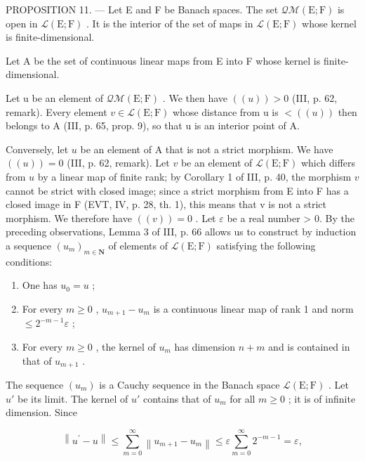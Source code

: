 PROPOSITION 11. --- Let E and F be Banach spaces. The set \(\mathcal{Q}\mathcal{M}(\mathrm{E};\mathrm{F})\) is open in \(\mathcal{L}(\mathrm{E};\mathrm{F})\) . It is the interior of the set of maps in \(\mathcal{L}(\mathrm{E};\mathrm{F})\) whose kernel is finite-dimensional.

Let A be the set of continuous linear maps from E into F whose kernel is finite-dimensional.

Let u be an element of \(\mathcal{Q}\mathcal{M}(\mathrm{E};\mathrm{F})\) . We then have \(((u)) > 0\) (III, p. 62, remark). Every element \(v \in \mathcal{L}(\mathrm{E};\mathrm{F})\) whose distance from u is \(<((u))\) then belongs to A (III, p. 65, prop. 9), so that u is an interior point of A.

Conversely, let \(u\) be an element of A that is not a strict morphism. We have \(((u)) = 0\) (III, p. 62, remark). Let \(v\) be an element of \(\mathcal{L}(\mathrm{E};\mathrm{F})\) which differs from \(u\) by a linear map of finite rank; by Corollary 1 of III, p. 40, the morphism \(v\) cannot be strict with closed image; since a strict morphism from E into F has a closed image in F (EVT, IV, p. 28, th. 1), this means that v is not a strict morphism. We therefore have \(((v)) = 0\) . Let \(\varepsilon\) be a real number \textgreater{} 0. By the preceding observations, Lemma 3 of III, p. 66 allows us to construct by induction a sequence \((u_{m})_{m \in \mathbf{N}}\) of elements of \(\mathcal{L}(\mathrm{E}; \mathrm{F})\) satisfying the following conditions:

\begin{enumerate}
\def\labelenumi{(\roman{enumi})}
\item
  One has \(u_{0}=u\) ;
\item
  For every \(m \geqslant 0\) , \(u_{m+1} - u_m\) is a continuous linear map of rank 1 and norm \(\leqslant 2^{-m-1}\varepsilon\) ;
\item
  For every \(m \geqslant 0\) , the kernel of \(u_m\) has dimension \(n + m\) and is contained in that of \(u_{m+1}\) .
\end{enumerate}

The sequence \((u_{m})\) is a Cauchy sequence in the Banach space \(\mathcal{L}(\mathrm{E};\mathrm{F})\) . Let \(u'\) be its limit. The kernel of \(u'\) contains that of \(u_{m}\) for all \(m \geqslant 0\) ; it is of infinite dimension. Since

\[
\left\| u ^ {\prime} - u \right\| \leqslant \sum_ {m = 0} ^ {\infty} \left\| u _ {m + 1} - u _ {m} \right\| \leqslant \varepsilon \sum_ {m = 0} ^ {\infty} 2 ^ {- m - 1} = \varepsilon ,
\]

